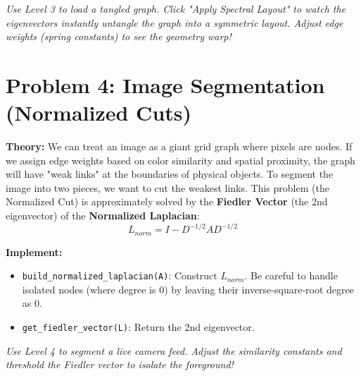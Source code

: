 \documentclass[11pt]{article}
\begin{document}
\textit{Use Level 3 to load a tangled graph. Click "Apply Spectral Layout" to watch the eigenvectors instantly untangle the graph into a symmetric layout. Adjust edge weights (spring constants) to see the geometry warp!}

\section*{Problem 4: Image Segmentation (Normalized Cuts)}

\textbf{Theory:} We can treat an image as a giant grid graph where pixels are nodes. If we assign edge weights based on color similarity and spatial proximity, the graph will have "weak links" at the boundaries of physical objects. 
To segment the image into two pieces, we want to cut the weakest links. This problem (the Normalized Cut) is approximately solved by the \textbf{Fiedler Vector} (the 2nd eigenvector) of the \textbf{Normalized Laplacian}:
$$ L_{norm} = I - D^{-1/2} A D^{-1/2} $$

\textbf{Implement:}
\begin{itemize}
    \item \lstinline|build_normalized_laplacian(A)|: Construct $L_{norm}$. Be careful to handle isolated nodes (where degree is 0) by leaving their inverse-square-root degree as 0.
    \item \lstinline|get_fiedler_vector(L)|: Return the 2nd eigenvector.
\end{itemize}

\textit{Use Level 4 to segment a live camera feed. Adjust the similarity constants and threshold the Fiedler vector to isolate the foreground!}
\end{document}

